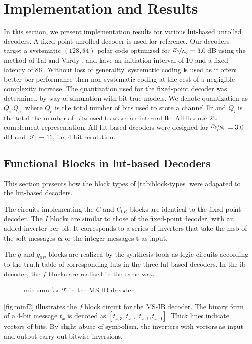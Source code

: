 \documentclass[conference,letterpaper]{IEEEtran}
\newcommand{\mvec}[1]{\bm{#1}}
\begin{document}
\section{Implementation and Results}\label{sec:impl}

In this section, we present implementation results for various \gls{lut}-based unrolled decoders. A fixed-point unrolled decoder is used for reference. Our decoders target a systematic $(128,64)$ polar code optimized for $\sfrac{E_b}{N_0}=3.0$\,dB using the method of Tal and Vardy \cite{Tal2011a}, and have an initiation interval of $10$ and a fixed latency of 86\,. Without loss of generality, systematic coding is used as it offers better \gls{ber} performance than non-systematic coding at the cost of a negligible complexity increase. The quantization used for the fixed-point decoder was determined by way of simulation with bit-true models.
We denote quantization as $Q_i$.$Q_c$, where $Q_c$ is the total number of bits used to store a channel \gls{llr} and $Q_i$ is the total the number of bits used to store an internal \gls{llr}.
All \glspl{llr} use 2's complement representation.
All \gls{lut}-based decoders were designed for $\sfrac{E_b}{N_0}=3.0$\,dB and $|\mathcal{T}|=16$, i.e, 4-bit resolution.

\subsection{Functional Blocks in \gls{lut}-based Decoders}
This section presents how the block types of \autoref{tab:block-types} were adapated to the \gls{lut}-based decoders.

The circuits implementing the $C$ and $C_{0R}$ blocks are identical to the fixed-point decoder. The $I$ blocks are similar to those of the fixed-point decoder, with an added inverter per bit. It corresponds to a series of inverters that take the \gls{msb} of the soft messages $\mvec{\alpha}$ or the integer messages $\mvec{t}$ as input. 

The $g$ and $g_{0R}$ blocks are realized by the synthesis tools as logic circuits according to the truth table of corresponding \glspl{lut} in the three \gls{lut}-based decoders. In the \gls{ib} decoder, the ${f}$ blocks are realized in the same way.

\begin{figure}[t]
  \centering
  \resizebox{\columnwidth}{!}{}
  \caption{min-sum for $\mathcal{T}$ in the MS-IB decoder.}
  \label{fig:minf2}
\end{figure}
\autoref{fig:minf2} illustrates the $f$ block circuit for the MS-IB decoder. The binary form of a 4-bit message $t_{x}$ is denoted as $[t_{x,3},t_{x,2},t_{x,1},t_{x,0}]$. Thick lines indicate vectors of bits. By slight abuse of symbolism, the inverters with vectors as input and output carry out bitwise inversions.
\end{document}
